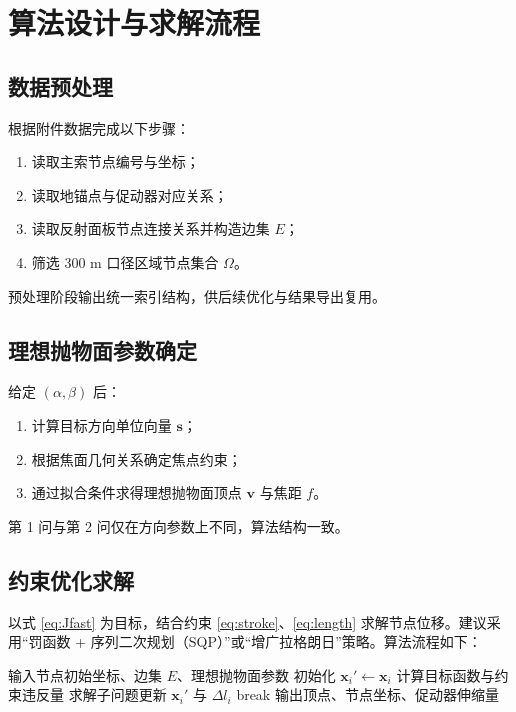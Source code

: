 \chapter{算法设计与求解流程}

\section{数据预处理}
根据附件数据完成以下步骤：
\begin{enumerate}
  \item 读取主索节点编号与坐标；
  \item 读取地锚点与促动器对应关系；
  \item 读取反射面板节点连接关系并构造边集 $E$；
  \item 筛选 300 m 口径区域节点集合 $\Omega$。
\end{enumerate}
预处理阶段输出统一索引结构，供后续优化与结果导出复用。

\section{理想抛物面参数确定}
给定 $(\alpha,\beta)$ 后：
\begin{enumerate}
  \item 计算目标方向单位向量 $\mathbf s$；
  \item 根据焦面几何关系确定焦点约束；
  \item 通过拟合条件求得理想抛物面顶点 $\mathbf v$ 与焦距 $f$。
\end{enumerate}
第 1 问与第 2 问仅在方向参数上不同，算法结构一致。

\section{约束优化求解}
以式 \eqref{eq:Jfast} 为目标，结合约束 \eqref{eq:stroke}、\eqref{eq:length} 求解节点位移。建议采用“罚函数 + 序列二次规划（SQP）”或“增广拉格朗日”策略。算法流程如下：
\begin{algorithm}[H]
\caption{FAST 反射面节点约束优化}
\begin{algorithmic}[1]
\State 输入节点初始坐标、边集 $E$、理想抛物面参数
\State 初始化 $\mathbf x_i' \gets \mathbf x_i$
  \State 计算目标函数与约束违反量
  \State 求解子问题更新 $\mathbf x_i'$ 与 $\Delta l_i$
    \State break
  \EndIf
\EndFor
\State 输出顶点、节点坐标、促动器伸缩量
\end{algorithmic}
\end{algorithm}

